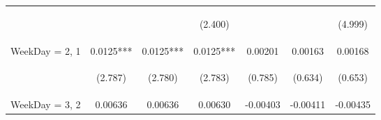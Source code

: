 \documentclass{standalone}
\begin{document}
\begin{tabular}{lcccccc}
    \vspace{4pt}     & \begin{footnotesize}\end{footnotesize}          & \begin{footnotesize}\end{footnotesize}          & \begin{footnotesize}(2.400)\end{footnotesize}   & \begin{footnotesize}\end{footnotesize}         & \begin{footnotesize}\end{footnotesize}         & \begin{footnotesize}(4.999)\end{footnotesize}  \\
    WeekDay = 2, 1   & 0.0125***                                       & 0.0125***                                       & 0.0125***                                       & 0.00201                                        & 0.00163                                        & 0.00168                                        \\
    \vspace{4pt}     & \begin{footnotesize}(2.787)\end{footnotesize}   & \begin{footnotesize}(2.780)\end{footnotesize}   & \begin{footnotesize}(2.783)\end{footnotesize}   & \begin{footnotesize}(0.785)\end{footnotesize}  & \begin{footnotesize}(0.634)\end{footnotesize}  & \begin{footnotesize}(0.653)\end{footnotesize}  \\
    WeekDay = 3, 2   & 0.00636                                         & 0.00636                                         & 0.00630                                         & -0.00403                                       & -0.00411                                       & -0.00435                                       \\

\end{tabular}
\end{document}
